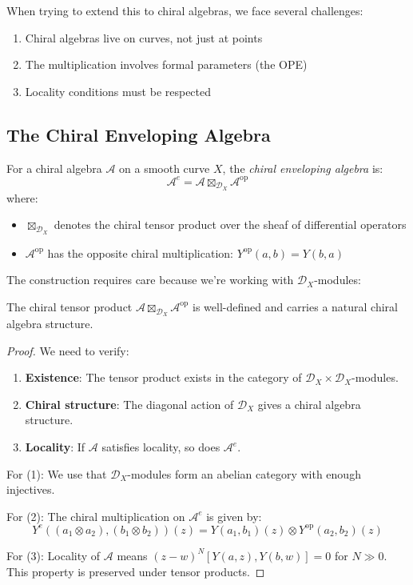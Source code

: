 When trying to extend this to chiral algebras, we face several challenges:
\begin{enumerate}
\item Chiral algebras live on curves, not just at points
\item The multiplication involves formal parameters (the OPE)
\item Locality conditions must be respected
\end{enumerate}

\subsection{The Chiral Enveloping Algebra}

\begin{definition}
For a chiral algebra $\mathcal{A}$ on a smooth curve $X$, the \emph{chiral enveloping algebra} is:
\[
\mathcal{A}^e = \mathcal{A} \boxtimes_{\mathcal{D}_X} \mathcal{A}^{\text{op}}
\]
where:
\begin{itemize}
\item $\boxtimes_{\mathcal{D}_X}$ denotes the chiral tensor product over the sheaf of differential operators
\item $\mathcal{A}^{\text{op}}$ has the opposite chiral multiplication: $Y^{\text{op}}(a,b) = Y(b,a)$
\end{itemize}
\end{definition}

The construction requires care because we're working with $\mathcal{D}_X$-modules:

\begin{lemma}
The chiral tensor product $\mathcal{A} \boxtimes_{\mathcal{D}_X} \mathcal{A}^{\text{op}}$ is well-defined and carries a natural chiral algebra structure.
\end{lemma}

\begin{proof}
We need to verify:
\begin{enumerate}
\item \textbf{Existence}: The tensor product exists in the category of $\mathcal{D}_X \times \mathcal{D}_X$-modules.
\item \textbf{Chiral structure}: The diagonal action of $\mathcal{D}_X$ gives a chiral algebra structure.
\item \textbf{Locality}: If $\mathcal{A}$ satisfies locality, so does $\mathcal{A}^e$.
\end{enumerate}

For (1): We use that $\mathcal{D}_X$-modules form an abelian category with enough injectives.

For (2): The chiral multiplication on $\mathcal{A}^e$ is given by:
\[
Y^e((a_1 \otimes a_2), (b_1 \otimes b_2))(z) = Y(a_1, b_1)(z) \otimes Y^{\text{op}}(a_2, b_2)(z)
\]

For (3): Locality of $\mathcal{A}$ means $(z-w)^N[Y(a,z), Y(b,w)] = 0$ for $N \gg 0$. This property is preserved under tensor products. \qedhere
\end{proof}


